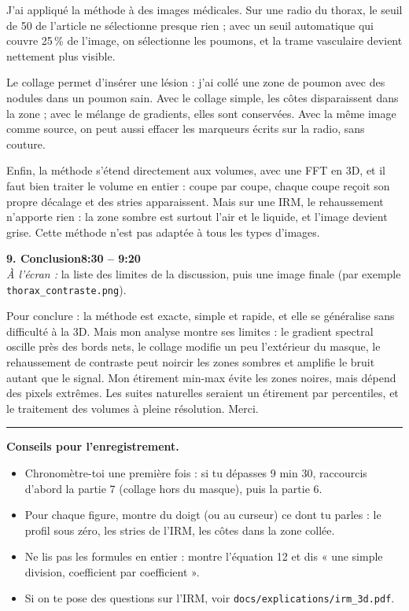 \documentclass[11pt,a4paper]{article}
\newcommand{\partie}[3]{\bigskip\noindent\colorbox{gray!15}{\parbox{\dimexpr\linewidth-2\fboxsep}{%
  \textbf{#1}\hfill\textbf{#2}\\ \small\textit{À l'écran :} #3}}\par}
\begin{document}
J'ai appliqué la méthode à des images médicales. Sur une radio du thorax, le seuil de 50 de l'article ne
sélectionne presque rien ; avec un seuil automatique qui couvre 25\,\% de l'image, on sélectionne les
poumons, et la trame vasculaire devient nettement plus visible.

Le collage permet d'insérer une lésion : j'ai collé une zone de poumon avec des nodules dans un poumon
sain. Avec le collage simple, les côtes disparaissent dans la zone ; avec le mélange de gradients, elles
sont conservées. Avec la même image comme source, on peut aussi effacer les marqueurs écrits sur la
radio, sans couture.

Enfin, la méthode s'étend directement aux volumes, avec une FFT en 3D, et il faut bien traiter le volume
en entier : coupe par coupe, chaque coupe reçoit son propre décalage et des stries apparaissent. Mais sur
une IRM, le rehaussement n'apporte rien : la zone sombre est surtout l'air et le liquide, et l'image
devient grise. Cette méthode n'est pas adaptée à tous les types d'images.

\partie{9. Conclusion}{8:30 -- 9:20}{la liste des limites de la discussion, puis une image finale
(par exemple \texttt{thorax\_contraste.png}).}

Pour conclure : la méthode est exacte, simple et rapide, et elle se généralise sans difficulté à la 3D.
Mais mon analyse montre ses limites : le gradient spectral oscille près des bords nets, le collage modifie
un peu l'extérieur du masque, le rehaussement de contraste peut noircir les zones sombres et amplifie le
bruit autant que le signal. Mon étirement min-max évite les zones noires, mais dépend des pixels
extrêmes. Les suites naturelles seraient un étirement par percentiles, et le traitement des volumes à
pleine résolution. Merci.

\bigskip
\hrule
\medskip
\textbf{Conseils pour l'enregistrement.}
\begin{itemize}
  \item Chronomètre-toi une première fois : si tu dépasses 9 min 30, raccourcis d'abord la partie 7
  (collage hors du masque), puis la partie 6.
  \item Pour chaque figure, montre du doigt (ou au curseur) ce dont tu parles : le profil sous zéro,
  les stries de l'IRM, les côtes dans la zone collée.
  \item Ne lis pas les formules en entier : montre l'équation 12 et dis « une simple division,
  coefficient par coefficient ».
  \item Si on te pose des questions sur l'IRM, voir \texttt{docs/explications/irm\_3d.pdf}.
\end{itemize}
\end{document}
